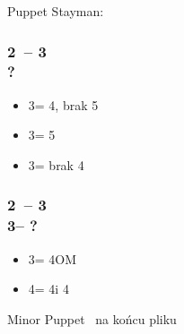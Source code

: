 \documentclass[12pt, a4paper]{report}
\begin{document}
{    Puppet Stayman:
    \subsubsection*{2\ntx\ -- 3\clubs \\ ?}
    \begin{itemize}
        \item 3\diams = 4\major, brak 5\major
        \item 3\major = 5\major
        \item 3\nt = brak 4\major
    \end{itemize}

    \subsubsection*{2\ntx\ -- 3\clubs \\ 
                    3\diams -- ?}
    \begin{itemize}
        \item 3\major = 4OM
        \item 4\diams = 4\hearts i 4\spades
    \end{itemize}

    {\color{red}Minor Puppet \leftarrow\ na końcu pliku}

}
\end{document}

